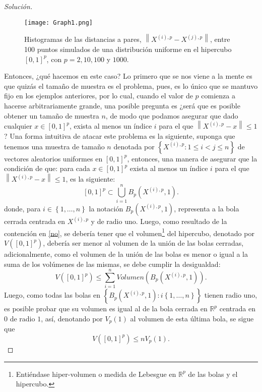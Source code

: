 \documentclass[10.5pt,notitlepage]{article}
\newenvironment{solucion}
  {\begin{proof}[Solución]}
  {\end{proof}}
\newcommand{\RR}{\mathbb{R}}
\newcommand{\norm}[1]{\left\| #1 \right\|}
\newcommand{\kis}[1]{\left\{ #1 \right\}}
\theoremstyle{plain}
\begin{document}
\begin{solucion}
\begin{figure}[htb]
    \centering
    \texttt{[image: Graph1.png]}
    \caption{Histogramas de las distancias a pares, \(\norm{X^{(i),p} - X^{(j),p}}\), entre 100 puntos simulados de una distribución uniforme en el hipercubo \([0,1]^p\), con \(p = 2,10,100\) y \(1000\).}
    \label{fig:5}
\end{figure}

Entonces, ¿qué hacemos en este caso? Lo primero que se nos viene a la mente es que quizás el tamaño de muestra es el problema, pues, es lo único que se mantuvo fijo en los ejemplos anteriores, por lo cual, cuando el valor de \(p\) comienza a hacerse arbitrariamente grande, una posible pregunta es  ¿será que es posible obtener un tamaño de muestra \(n\), de modo que podamos asegurar que dado cualquier \(x \in [0,1]^p\), exista al menos un índice \(i\) para el que \(\norm{X^{(i),p} - x}\leq 1\)? Una forma intuitiva de atacar este problema es la siguiente, suponga que tenemos una muestra de tamaño \(n\) denotada por \(\kis{X^{(i),p}: 1 \leq i < j \leq n}\) de vectores aleatorios uniformes en \([0,1]^p\), entonces, una manera de asegurar que la condición de que: para cada \(x \in [0,1]^p\) exista al menos un índice \(i\) para el que \(\norm{X^{(i),p} - x}\leq 1\), es la siguiente: 
\begin{equation}\label{no}
    [0,1]^{p} \subset \bigcup_{i = 1}^{n}B_{p}(X^{(i),p} ,1).
\end{equation}
donde, para \(i\in \kis{1, \hdots, n}\) la notación \(B_{p}(X^{(i),p} ,1)\), representa a la bola cerrada centrada en \(X^{(i),p}\) y de radio uno. Luego, como resultado de la contención en \eqref{no}, se debería tener que el volumen\footnote{Entiéndase hiper-volumen o medida de Lebesgue en \(\RR^p\) de las bolas y el hipercubo.} del hipercubo, denotado por \(V([0,1]^p)\), debería ser menor al volumen de la unión de las bolas cerradas, adicionalmente, como el volumen de la unión de las bolas es menor o igual a la suma de los volúmenes de las mismas, se debe cumplir la desigualdad:
\[
V([0,1]^p) \leq \sum_{i = 1 }^{n}Volumen(B_{p}(X^{(i),p} ,1)).
\]
Luego, como todas las bolas en \(\kis{B_{p}(X^{(i),p} ,1): i \kis{1, \hdots,n}}\) tienen radio uno, es posible probar que su volumen es igual al de la bola cerrada en \(\RR^p\) centrada en \(0\) de radio \(1\), así, denotando por \(V_{p}(1)\) al volumen de esta última bola, se sigue que
\begin{equation}\label{yacasi}
    V([0,1]^p) \leq n V_{p}(1). 
\end{equation}

\end{solucion}
\end{document}
